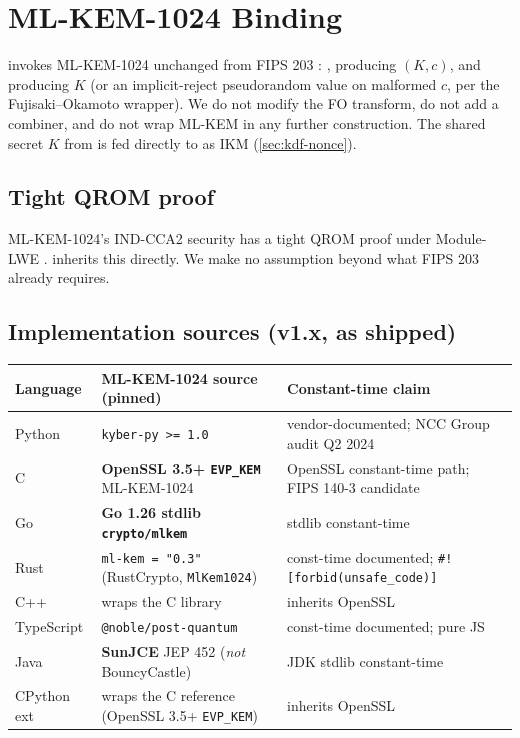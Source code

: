 \section{ML-KEM-1024 Binding}
\label{sec:mlkem}

\pqcrypt{} invokes ML-KEM-1024 unchanged from FIPS 203 \citep{fips203}: ,  producing $(K, c)$, and  producing $K$ (or an implicit-reject pseudorandom value on malformed $c$, per the Fujisaki--Okamoto wrapper). We do not modify the FO transform, do not add a combiner, and do not wrap ML-KEM in any further construction. The shared secret $K$ from  is fed directly to  as IKM (\cref{sec:kdf-nonce}).

\subsection{Tight QROM proof}

ML-KEM-1024's IND-CCA2 security has a tight QROM proof under Module-LWE \citep{hofheinz2017fo,don2022qrom}. \pqcrypt{} inherits this directly. We make no assumption beyond what FIPS 203 already requires.

\subsection{Implementation sources (v1.x, as shipped)}

\begin{center}
\small
\begin{tabular}{@{}lll@{}}
\toprule
\textbf{Language} & \textbf{ML-KEM-1024 source (pinned)} & \textbf{Constant-time claim} \\
\midrule
Python      & \texttt{kyber-py >= 1.0}                                & vendor-documented; NCC Group audit Q2 2024 \\
C           & \textbf{OpenSSL 3.5+ \texttt{EVP\_KEM}} ML-KEM-1024      & OpenSSL constant-time path; FIPS 140-3 candidate \\
Go          & \textbf{Go 1.26 stdlib \texttt{crypto/mlkem}}           & stdlib constant-time \\
Rust        & \texttt{ml-kem = "0.3"} (RustCrypto, \texttt{MlKem1024}) & const-time documented; \texttt{\#![forbid(unsafe\_code)]} \\
C++         & wraps the C library                                     & inherits OpenSSL \\
TypeScript  & \texttt{@noble/post-quantum}                            & const-time documented; pure JS \\
Java        & \textbf{SunJCE} JEP 452 (\emph{not} BouncyCastle)        & JDK stdlib constant-time \\
CPython ext & wraps the C reference (OpenSSL 3.5+ \texttt{EVP\_KEM})    & inherits OpenSSL \\
\bottomrule
\end{tabular}
\end{center}

